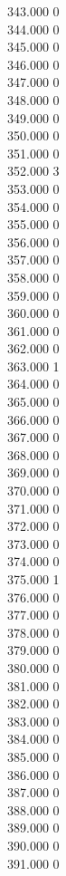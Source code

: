 { 343.000	0 \\
 344.000	0 \\
 345.000	0 \\
 346.000	0 \\
 347.000	0 \\
 348.000	0 \\
 349.000	0 \\
 350.000	0 \\
 351.000	0 \\
 352.000	3 \\
 353.000	0 \\
 354.000	0 \\
 355.000	0 \\
 356.000	0 \\
 357.000	0 \\
 358.000	0 \\
 359.000	0 \\
 360.000	0 \\
 361.000	0 \\
 362.000	0 \\
 363.000	1 \\
 364.000	0 \\
 365.000	0 \\
 366.000	0 \\
 367.000	0 \\
 368.000	0 \\
 369.000	0 \\
 370.000	0 \\
 371.000	0 \\
 372.000	0 \\
 373.000	0 \\
 374.000	0 \\
 375.000	1 \\
 376.000	0 \\
 377.000	0 \\
 378.000	0 \\
 379.000	0 \\
 380.000	0 \\
 381.000	0 \\
 382.000	0 \\
 383.000	0 \\
 384.000	0 \\
 385.000	0 \\
 386.000	0 \\
 387.000	0 \\
 388.000	0 \\
 389.000	0 \\
 390.000	0 \\
 391.000	0 \\
}
